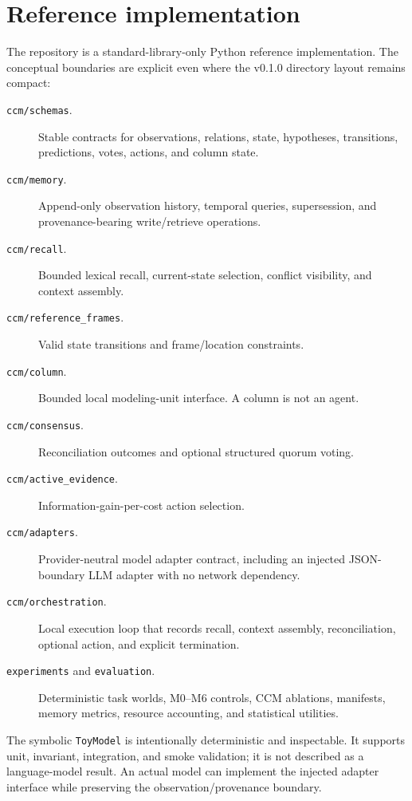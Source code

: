 \section{Reference implementation}

The repository is a standard-library-only Python reference implementation. The conceptual boundaries are explicit even where the v0.1.0 directory layout remains compact:

\begin{description}
  \item[\texttt{ccm/schemas}.] Stable contracts for observations, relations, state, hypotheses, transitions, predictions, votes, actions, and column state.
  \item[\texttt{ccm/memory}.] Append-only observation history, temporal queries, supersession, and provenance-bearing write/retrieve operations.
  \item[\texttt{ccm/recall}.] Bounded lexical recall, current-state selection, conflict visibility, and context assembly.
  \item[\texttt{ccm/reference\_frames}.] Valid state transitions and frame/location constraints.
  \item[\texttt{ccm/column}.] Bounded local modeling-unit interface. A column is not an agent.
  \item[\texttt{ccm/consensus}.] Reconciliation outcomes and optional structured quorum voting.
  \item[\texttt{ccm/active\_evidence}.] Information-gain-per-cost action selection.
  \item[\texttt{ccm/adapters}.] Provider-neutral model adapter contract, including an injected JSON-boundary LLM adapter with no network dependency.
  \item[\texttt{ccm/orchestration}.] Local execution loop that records recall, context assembly, reconciliation, optional action, and explicit termination.
  \item[\texttt{experiments} and \texttt{evaluation}.] Deterministic task worlds, M0--M6 controls, CCM ablations, manifests, memory metrics, resource accounting, and statistical utilities.
\end{description}

The symbolic \texttt{ToyModel} is intentionally deterministic and inspectable. It supports unit, invariant, integration, and smoke validation; it is not described as a language-model result. An actual model can implement the injected adapter interface while preserving the observation/provenance boundary.

